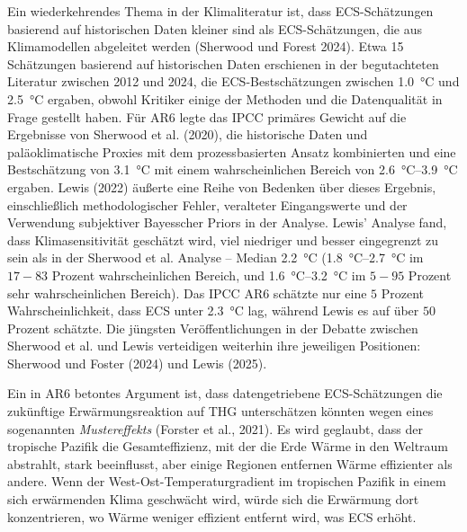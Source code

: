 \documentclass[12pt,paper=a4,DIV=12,parskip=never,chapterprefix=false,headings=standardclasses]{scrreprt}
\begin{document}
Ein wiederkehrendes Thema in der Klimaliteratur ist, dass ECS-Schätzungen basierend auf historischen Daten kleiner sind als ECS-Schätzungen, die aus Klimamodellen abgeleitet werden (Sherwood und Forest 2024). Etwa 15 Schätzungen basierend auf historischen Daten erschienen in der begutachteten Literatur zwischen 2012 und 2024, die ECS-Bestschätzungen zwischen \SI{1.0}{\celsius} und \SI{2.5}{\celsius} ergaben, obwohl Kritiker einige der Methoden und die Datenqualität in Frage gestellt haben. Für AR6 legte das IPCC primäres Gewicht auf die Ergebnisse von Sherwood et al. (2020), die historische Daten und paläoklimatische Proxies mit dem prozessbasierten Ansatz kombinierten und eine Bestschätzung von \SI{3.1}{\celsius} mit einem wahrscheinlichen Bereich von \SIrange{2.6}{3.9}{\celsius} ergaben. Lewis (2022) äußerte eine Reihe von Bedenken über dieses Ergebnis, einschließlich methodologischer Fehler, veralteter Eingangswerte und der Verwendung subjektiver Bayesscher Priors in der Analyse. Lewis' Analyse fand, dass Klimasensitivität geschätzt wird, viel niedriger und besser eingegrenzt zu sein als in der Sherwood et al. Analyse – Median \SI{2.2}{\celsius} (\SIrange{1.8}{2.7}{\celsius} im $17-83$ Prozent wahrscheinlichen Bereich, und \SIrange{1.6}{3.2}{\celsius} im $5-95$ Prozent sehr wahrscheinlichen Bereich). Das IPCC AR6 schätzte nur eine $5$ Prozent Wahrscheinlichkeit, dass ECS unter \SI{2.3}{\celsius} lag, während Lewis es auf über $50$ Prozent schätzte. Die jüngsten Veröffentlichungen in der Debatte zwischen Sherwood et al. und Lewis verteidigen weiterhin ihre jeweiligen Positionen: Sherwood und Foster (2024) und Lewis (2025).

Ein in AR6 betontes Argument ist, dass datengetriebene ECS-Schätzungen die zukünftige Erwärmungsreaktion auf THG unterschätzen könnten wegen eines sogenannten \emph{Mustereffekts} (Forster et al., 2021). Es wird geglaubt, dass der tropische Pazifik die Gesamteffizienz, mit der die Erde Wärme in den Weltraum abstrahlt, stark beeinflusst, aber einige Regionen entfernen Wärme effizienter als andere. Wenn der West-Ost-Temperaturgradient im tropischen Pazifik in einem sich erwärmenden Klima geschwächt wird, würde sich die Erwärmung dort konzentrieren, wo Wärme weniger effizient entfernt wird, was ECS erhöht.
\end{document}
